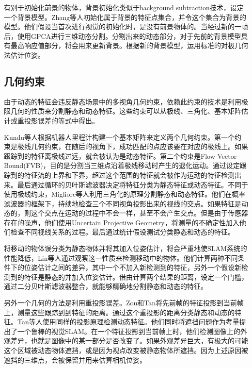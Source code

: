 有别于初始化前景的物体，背景初始化类似于background subtraction技术，设定一个背景模型\cite{Babaee2017A,Piccardi2005Background}。Zhang等人\cite{Zhang2012Visual}初始化属于背景的特征点集合，并令这个集合为背景的模型。他们假设当首次进行视觉的初始化时，是没有前景物体的。当经过新的一帧后，使用GPCA\cite{Ren2005Generalized}进行三维动态分割。分割出来的动态部分，对于先前的背景模型具有最高响应值部分，将会用来更新背景。根据新的背景模型，运用标准的对极几何法估计位姿。

\subsection{几何约束}
由于动态的特征会违反静态场景中的多视角几何约束，依赖此约束的技术是利用极限几何的性质\cite{Hartley2008Multiple}来分割静态和动态特征。这些约束可以从极线、三角化、基本矩阵估计或重投影误差的等式中得出。

Kundu等人\cite{Kundu2009Moving}根据机器人里程计构建一个基本矩阵来定义两个几何约束。第一个约束是极线几何约束，在随后的视角下，成功匹配的点应该要在对应的极线上。如果跟踪到的特征离极线过远，就会被认为是动态特征。第二个约束是Flow Vector Bound(FVB)，目的是分割当三维点沿着极线移动时产生的退化运动。通过设定跟踪到的特征流的上界和下界，超过这个范围的特征就会被作为运动的特征检测出来。最后通过循环的贝叶斯滤波器决定将特征分类为静态特征或动态特征。不同于使用极线约束，Migliore等人\cite{Migliore2009Use}利用三角化的原理分割静态和动态特征。他们在概率滤波器的框架下，持续地检查三个不同视角投影出来的视线的交点。如果特征是动态的，则这个交点在运动的过程中不会一样，甚至不会产生交点。但是由于传感器存在的噪声，他们使用Uncertain Projective Geometry\cite{Heuel2001Matching}，将测量的不确定性加入他们检查不同视线关系的过程。最后通过统计假设测试分类静态和动态的特征。

将移动的物体误分类为静态物体并将其加入位姿估计，将会严重地使SLAM系统的性能降低，Lin等人\cite{Wang2007Simultaneous}通过观察这一性质来检测移动中的物体。他们计算两种不同条件下的位姿估计之间的差异，其中一个不加入新检测到的特征，另外一个假设新检测到的特征是静态的并加入位姿估计。借由计算两个结果的距离，设定一个门槛，通过二分贝叶斯滤波器整合，就能够精确地分割静态和动态的特征。

另外一个几何的方法是利用重投影误差。Zou和Tan\cite{Danping2013CoSLAM}将先前帧的特征投影到当前帧上，测量这些跟踪到到特征的距离。通过这个重投影的距离分类静态和动态的特征。Tan等人\cite{Wei2013Robust}使用同样的投影原理检测动态特征。他们同时将遮挡问题作为考量提出了一个鲁棒的视觉SLAM。在一个特征投影到当前帧上时，他们检测图像上的外观差异，也就是图像中的某一部分是否改变了。如果外观差异巨大，有极大的可能这个区域被动态物体遮挡，或是因为视点改变被静态物体所遮挡。因为上述原因被遮挡的三维点，会被保留并用来估算相机位姿。

